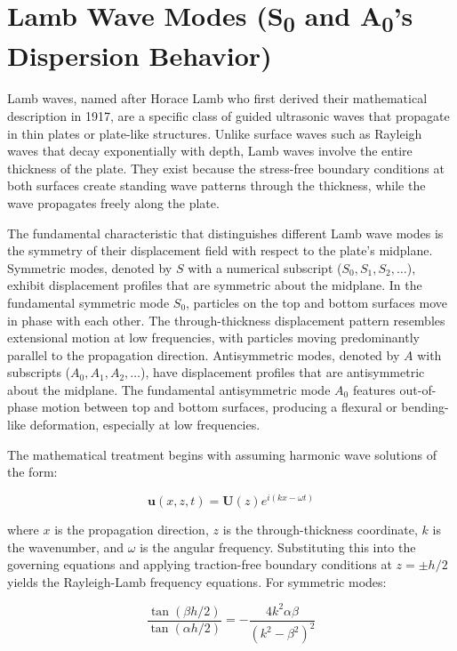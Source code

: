 \documentclass[12pt,a4paper]{report}
\begin{document}
\section{Lamb Wave Modes (S\textsubscript{0} and A\textsubscript{0}'s Dispersion Behavior)}

Lamb waves, named after Horace Lamb who first derived their mathematical description in 1917, are a specific class of guided ultrasonic waves that propagate in thin plates or plate-like structures. Unlike surface waves such as Rayleigh waves that decay exponentially with depth, Lamb waves involve the entire thickness of the plate. They exist because the stress-free boundary conditions at both surfaces create standing wave patterns through the thickness, while the wave propagates freely along the plate.

The fundamental characteristic that distinguishes different Lamb wave modes is the symmetry of their displacement field with respect to the plate's midplane. Symmetric modes, denoted by $S$ with a numerical subscript ($S_0, S_1, S_2, \ldots$), exhibit displacement profiles that are symmetric about the midplane. In the fundamental symmetric mode $S_0$, particles on the top and bottom surfaces move in phase with each other. The through-thickness displacement pattern resembles extensional motion at low frequencies, with particles moving predominantly parallel to the propagation direction. Antisymmetric modes, denoted by $A$ with subscripts ($A_0, A_1, A_2, \ldots$), have displacement profiles that are antisymmetric about the midplane. The fundamental antisymmetric mode $A_0$ features out-of-phase motion between top and bottom surfaces, producing a flexural or bending-like deformation, especially at low frequencies.

The mathematical treatment begins with assuming harmonic wave solutions of the form:

\begin{equation}
\mathbf{u}(x, z, t) = \mathbf{U}(z)e^{i(kx - \omega t)}
\end{equation}

where $x$ is the propagation direction, $z$ is the through-thickness coordinate, $k$ is the wavenumber, and $\omega$ is the angular frequency. Substituting this into the governing equations and applying traction-free boundary conditions at $z = \pm h/2$ yields the Rayleigh-Lamb frequency equations. For symmetric modes:

\begin{equation}
\frac{\tan(\beta h/2)}{\tan(\alpha h/2)} = -\frac{4k^2 \alpha \beta}{(k^2 - \beta^2)^2}
\end{equation}
\end{document}
